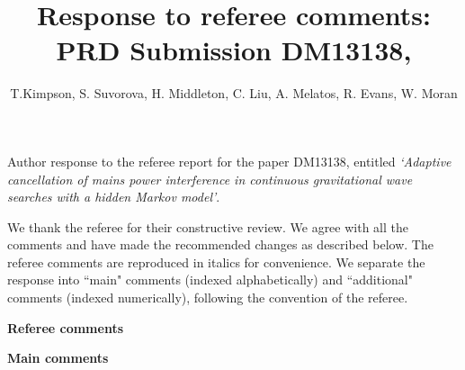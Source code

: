 \documentclass[10pt]{article}
\author{T.Kimpson, S. Suvorova, H. Middleton, C. Liu, A. Melatos, R. Evans, W. Moran}
\title{Response to referee comments: \\ PRD Submission DM13138,}
\begin{document}
	\maketitle
\noindent Author response to the referee report for the paper DM13138,
entitled \textit{`Adaptive cancellation of mains power interference in continuous gravitational wave searches with a hidden Markov model'}. \newline 

\noindent We thank the referee for their constructive review.
We agree with all the comments and have made the recommended changes as described below. The referee comments are reproduced in italics for convenience. We separate the response into ``main" comments (indexed alphabetically) and ``additional" comments (indexed numerically), following the convention of the referee.  \newline 



\newpage
\noindent \Large \textbf{Referee comments} \normalsize

\vspace{5mm}

\noindent \textbf{Main comments}
\end{document}
